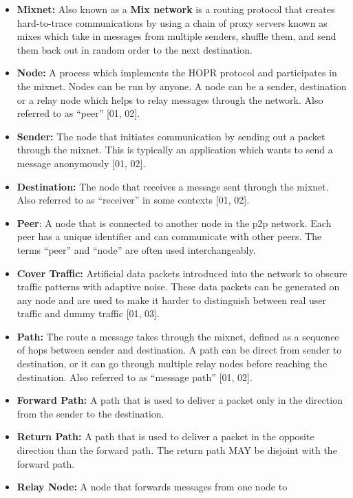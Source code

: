 \begin{itemize}
\item
  \textbf{Mixnet:} Also known as a \textbf{Mix network} is a routing
  protocol that creates hard-to-trace communications by using a chain of
  proxy servers known as mixes which take in messages from multiple
  senders, shuffle them, and send them back out in random order to the
  next destination.
\item
  \textbf{Node:} A process which implements the HOPR protocol and
  participates in the mixnet. Nodes can be run by anyone. A node can be
  a sender, destination or a relay node which helps to relay messages
  through the network. Also referred to as ``peer'' {[}01, 02{]}.
\item
  \textbf{Sender:} The node that initiates communication by sending out
  a packet through the mixnet. This is typically an application which
  wants to send a message anonymously {[}01, 02{]}.
\item
  \textbf{Destination:} The node that receives a message sent through
  the mixnet. Also referred to as ``receiver'' in some contexts {[}01,
  02{]}.
\item
  \textbf{Peer}: A node that is connected to another node in the p2p
  network. Each peer has a unique identifier and can communicate with
  other peers. The terms ``peer'' and ``node'' are often used
  interchangeably.
\item
  \textbf{Cover Traffic:} Artificial data packets introduced into the
  network to obscure traffic patterns with adaptive noise. These data
  packets can be generated on any node and are used to make it harder to
  distinguish between real user traffic and dummy traffic {[}01, 03{]}.
\item
  \textbf{Path:} The route a message takes through the mixnet, defined
  as a sequence of hops between sender and destination. A path can be
  direct from sender to destination, or it can go through multiple relay
  nodes before reaching the destination. Also referred to as ``message
  path'' {[}01, 02{]}.
\item
  \textbf{Forward Path:} A path that is used to deliver a packet only in
  the direction from the sender to the destination.
\item
  \textbf{Return Path:} A path that is used to deliver a packet in the
  opposite direction than the forward path. The return path MAY be
  disjoint with the forward path.
\item
  \textbf{Relay Node:} A node that forwards messages from one node to

\end{itemize}
